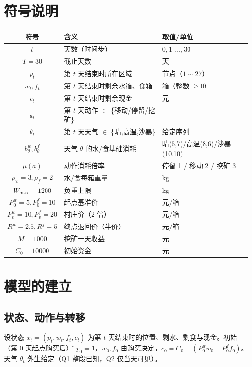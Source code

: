 \documentclass[12pt,a4paper]{ctexart}
\begin{document}
\section{符号说明}

\begin{center}
\begin{tabular}{cll}
\toprule
符号 & 含义 & 取值/单位 \\
\midrule
$t$ & 天数（时间步） & $0,1,\dots,30$ \\
$T=30$ & 截止天数 & 天 \\
$p_t$ & 第 $t$ 天结束时所在区域 & 节点（$1{\sim}27$） \\
$w_t,f_t$ & 第 $t$ 天结束时剩余水箱、食箱 & 箱（整数 $\ge 0$） \\
$c_t$ & 第 $t$ 天结束时剩余现金 & 元 \\
$a_t$ & 第 $t$ 天动作 $\in$ \{移动/停留/挖矿\} & --- \\
$\theta_t$ & 第 $t$ 天天气 $\in$ \{晴,高温,沙暴\} & 给定序列 \\
$b^w_\theta,b^f_\theta$ & 天气 $\theta$ 的水/食基础消耗 & 晴(5,7)/高温(8,6)/沙暴(10,10) \\
$\mu(a)$ & 动作消耗倍率 & 停留 1 / 移动 2 / 挖矿 3 \\
$\rho_w{=}3,\rho_f{=}2$ & 水/食每箱重量 & kg \\
$W_{\max}{=}1200$ & 负重上限 & kg \\
$P^w_0{=}5,P^f_0{=}10$ & 起点基准价 & 元/箱 \\
$P^w_v{=}10,P^f_v{=}20$ & 村庄价（2 倍） & 元/箱 \\
$R^w{=}2.5,R^f{=}5$ & 终点退回价（半价） & 元/箱 \\
$M{=}1000$ & 挖矿一天收益 & 元 \\
$C_0{=}10000$ & 初始资金 & 元 \\
\bottomrule
\end{tabular}
\end{center}

\section{模型的建立}

\subsection{状态、动作与转移}

设状态 $x_t=(p_t,w_t,f_t,c_t)$ 为第 $t$ 天结束时的位置、剩水、剩食与现金。初始（第 0 天起点购买后）：$p_0=1$，$w_0,f_0$ 由购买决定，$c_0=C_0-(P^w_0 w_0+P^f_0 f_0)$。天气 $\theta_t$ 外生给定（Q1 整段已知，Q2 仅当天可见）。
\end{document}
